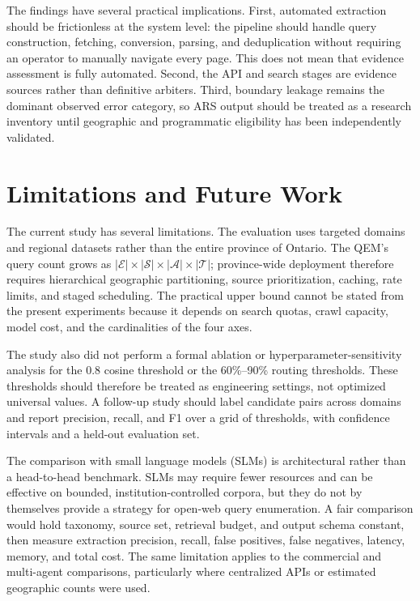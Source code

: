 \documentclass[12pt,oneside]{report}
\begin{document}
The findings have several practical implications. First, automated extraction should be frictionless at the system level: the pipeline should handle query construction, fetching, conversion, parsing, and deduplication without requiring an operator to manually navigate every page. This does not mean that evidence assessment is fully automated. Second, the API and search stages are evidence sources rather than definitive arbiters. Third, boundary leakage remains the dominant observed error category, so ARS output should be treated as a research inventory until geographic and programmatic eligibility has been independently validated.

\section{Limitations and Future Work}
The current study has several limitations. The evaluation uses targeted domains and regional datasets rather than the entire province of Ontario. The QEM's query count grows as $|\mathcal{E}|\times|\mathcal{S}|\times|\mathcal{A}|\times|\mathcal{T}|$; province-wide deployment therefore requires hierarchical geographic partitioning, source prioritization, caching, rate limits, and staged scheduling. The practical upper bound cannot be stated from the present experiments because it depends on search quotas, crawl capacity, model cost, and the cardinalities of the four axes.

The study also did not perform a formal ablation or hyperparameter-sensitivity analysis for the 0.8 cosine threshold or the 60\%--90\% routing thresholds. These thresholds should therefore be treated as engineering settings, not optimized universal values. A follow-up study should label candidate pairs across domains and report precision, recall, and F1 over a grid of thresholds, with confidence intervals and a held-out evaluation set.

The comparison with small language models (SLMs) is architectural rather than a head-to-head benchmark. SLMs may require fewer resources and can be effective on bounded, institution-controlled corpora, but they do not by themselves provide a strategy for open-web query enumeration. A fair comparison would hold taxonomy, source set, retrieval budget, and output schema constant, then measure extraction precision, recall, false positives, false negatives, latency, memory, and total cost. The same limitation applies to the commercial and multi-agent comparisons, particularly where centralized APIs or estimated geographic counts were used.
\end{document}
